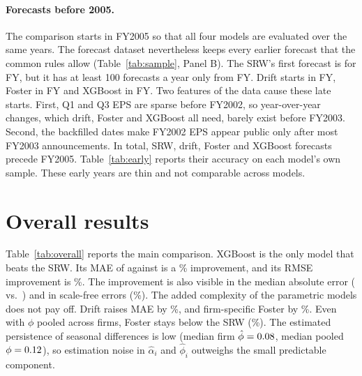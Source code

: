 \documentclass[11pt]{article}
\begin{document}
\paragraph{Forecasts before 2005.} The comparison starts in FY2005 so that all four models are evaluated over the
same years. The forecast dataset nevertheless keeps every earlier forecast that the common rules allow
(Table~\ref{tab:sample}, Panel B). The SRW's first forecast is for FY\Firstrw, but it has at least 100 forecasts a
year only from FY\FirstBroadrw. Drift starts in FY\Firstrwd, Foster in FY\Firstfoster{} and XGBoost in FY\Firstxgb.
Two features of the data cause these late starts. First, Q1 and Q3 EPS are sparse before FY2002, so year-over-year
changes, which drift, Foster and XGBoost all need, barely exist before FY2003. Second, the backfilled dates make FY2002
EPS appear public only after most FY2003 announcements. In total, \NPrerw{} SRW, \NPrerwd{} drift, \NPrefoster{}
Foster and \NPrexgb{} XGBoost forecasts precede FY2005. Table~\ref{tab:early} reports their accuracy on each model's
own sample. These early years are thin and not comparable across models.

\begin{table}[!htbp]
\centering\footnotesize
\caption{Forecasts before the comparison period, fiscal years with at least 100 SRW forecasts. Each model is
evaluated on its own forecasts; $\%\Delta$MAE compares it with the SRW on those same forecasts (shown when
$N\geq30$). MAE in CNY per share. XGBoost forecasts in \XGBfallbackYears{} use fixed, untuned hyperparameters.}
\label{tab:early}

\end{table}

\section{Overall results}

Table~\ref{tab:overall} reports the main comparison. XGBoost is the only model that beats the SRW. Its MAE of
\MAExgb{} against \MAErw{} is a \dMAExgb\% improvement, and its RMSE improvement is \dRMSExgb\%. The improvement is
also visible in the median absolute error (\MedAExgb{} vs.\ \MedAErw{}) and in scale-free errors (\dsMAExgb\%). The
added complexity of the parametric models does not pay off. Drift raises MAE by \mbox{\dMAErwd\%}, and firm-specific
Foster by \mbox{\dMAEfoster\%}. Even with $\phi$ pooled across firms, Foster stays below the SRW
(\mbox{\dMAEpooled\%}). The estimated persistence of seasonal differences is low (median firm $\hat\phi=0.08$,
median pooled $\phi=0.12$), so estimation noise in $\hat\alpha_i$ and $\hat\phi_i$ outweighs the small
predictable component.
\end{document}
